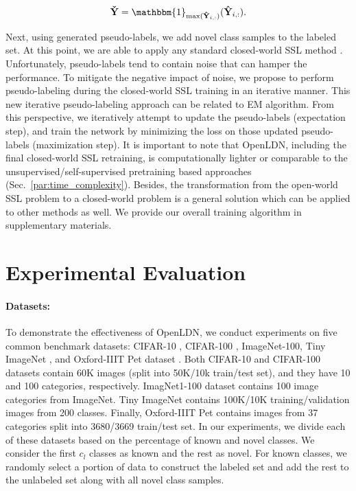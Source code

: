 \documentclass[runningheads]{eccv2022submission}
\begin{document}
\begin{align}
\label{eqn:pl}
    \mathbf{\check{Y}} = \mathbbm{1}_{\max(\mathbf{\hat{Y}}_{i,:})}(\mathbf{\hat{Y}}_{i,:}).
\end{align}

Next, using generated pseudo-labels, we add novel class samples to the labeled set. At this point, we are able to apply any standard closed-world SSL method \cite{NIPS2019_8749_MixMatch,xie2019unsupervised,FixMatch,NIPS2017_6719_meanT}. Unfortunately, pseudo-labels tend to contain noise that can hamper the performance. To mitigate the negative impact of noise, we propose to perform pseudo-labeling during the closed-world SSL training in an iterative manner. This new iterative pseudo-labeling approach can be related to EM algorithm. From this perspective, we iteratively attempt to update the pseudo-labels (expectation step), and train the network by minimizing the loss on those updated pseudo-labels (maximization step). It is important to note that OpenLDN, including the final closed-world SSL retraining, is computationally lighter or comparable to the unsupervised/self-supervised pretraining based approaches (Sec.~\ref{par:time_complexity}). Besides, the transformation from the open-world SSL problem to a closed-world problem is a general solution which can be applied to other methods as well. We provide our overall training algorithm in supplementary materials. 



\vspace{-2mm}
\section{Experimental Evaluation}
\vspace{-2mm}
\label{sec:exp}
\paragraph{\textbf{Datasets:}}
\label{para:dataset}
To demonstrate the effectiveness of OpenLDN, we conduct experiments on five common benchmark datasets: CIFAR-10 \cite{cifar10}, CIFAR-100 \cite{cifar100}, ImageNet-100\cite{deng2009imagenet}, Tiny ImageNet \cite{le2015tiny}, and Oxford-IIIT Pet dataset \cite{parkhi12a}. Both CIFAR-10 and CIFAR-100 datasets contain 60K images (split into 50K/10k train/test set), and they have 10 and 100 categories, respectively. ImagNet1-100 dataset contains 100 image categories from ImageNet. Tiny ImageNet contains 100K/10K training/validation images from 200 classes. Finally, Oxford-IIIT Pet contains images from 37 categories split into 3680/3669 train/test set. In our experiments, we divide each of these datasets based on the percentage of known and novel classes. We consider the first $c_l$ classes as known and the rest as novel. For known classes, we randomly select a portion of data to construct the labeled set and add the rest to the unlabeled set along with all novel class samples.
\end{document}
